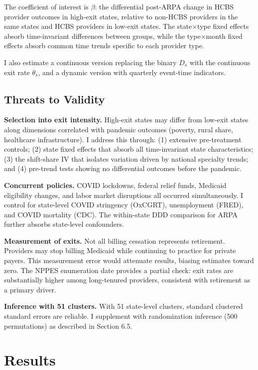 \documentclass[12pt]{article}
\begin{document}
The coefficient of interest is $\beta$: the differential post-ARPA change in HCBS provider outcomes in high-exit states, relative to non-HCBS providers in the same states and HCBS providers in low-exit states. The state$\times$type fixed effects absorb time-invariant differences between groups, while the type$\times$month fixed effects absorb common time trends specific to each provider type.

I also estimate a continuous version replacing the binary $D_s$ with the continuous exit rate $\theta_s$, and a dynamic version with quarterly event-time indicators.

\subsection{Threats to Validity}

\textbf{Selection into exit intensity.} High-exit states may differ from low-exit states along dimensions correlated with pandemic outcomes (poverty, rural share, healthcare infrastructure). I address this through: (1) extensive pre-treatment controls; (2) state fixed effects that absorb all time-invariant state characteristics; (3) the shift-share IV that isolates variation driven by national specialty trends; and (4) pre-trend tests showing no differential outcomes before the pandemic.

\textbf{Concurrent policies.} COVID lockdowns, federal relief funds, Medicaid eligibility changes, and labor market disruptions all occurred simultaneously. I control for state-level COVID stringency (OxCGRT), unemployment (FRED), and COVID mortality (CDC). The within-state DDD comparison for ARPA further absorbs state-level confounders.

\textbf{Measurement of exits.} Not all billing cessation represents retirement. Providers may stop billing Medicaid while continuing to practice for private payers. This measurement error would attenuate results, biasing estimates toward zero. The NPPES enumeration date provides a partial check: exit rates are substantially higher among long-tenured providers, consistent with retirement as a primary driver.

\textbf{Inference with 51 clusters.} With 51 state-level clusters, standard clustered standard errors are reliable. I supplement with randomization inference (500 permutations) as described in Section 6.5.


\section{Results}
\end{document}
